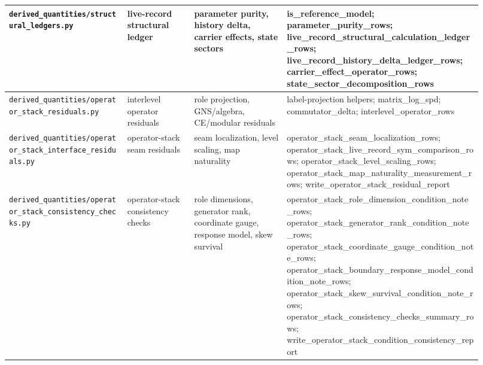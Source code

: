 \documentclass[11pt]{article}
\theoremstyle{remark}
\newcommand{\code}[1]{\texttt{#1}}
\numberwithin{equation}{section}
\begin{document}
\begin{longtable}{>{\raggedright\arraybackslash}p{0.23\linewidth}>{\raggedright\arraybackslash}p{0.13\linewidth}>{\raggedright\arraybackslash}p{0.18\linewidth}>{\raggedright\arraybackslash}p{0.38\linewidth}}
\hline
\code{derived\_\allowbreak{}quantities/structural\_\allowbreak{}ledgers.py} & live-record structural ledger & parameter purity, history delta, carrier effects, state sectors & is\_\allowbreak{}reference\_\allowbreak{}model; parameter\_\allowbreak{}purity\_\allowbreak{}rows; live\_\allowbreak{}record\_\allowbreak{}structural\_\allowbreak{}calculation\_\allowbreak{}ledger\_\allowbreak{}rows; live\_\allowbreak{}record\_\allowbreak{}history\_\allowbreak{}delta\_\allowbreak{}ledger\_\allowbreak{}rows; carrier\_\allowbreak{}effect\_\allowbreak{}operator\_\allowbreak{}rows; state\_\allowbreak{}sector\_\allowbreak{}decomposition\_\allowbreak{}rows\\
\hline
\code{derived\_\allowbreak{}quantities/operator\_\allowbreak{}stack\_\allowbreak{}residuals.py} & interlevel operator residuals & role projection, GNS/algebra, CE/modular residuals & label-projection helpers; matrix\_\allowbreak{}log\_\allowbreak{}spd; commutator\_\allowbreak{}delta; interlevel\_\allowbreak{}operator\_\allowbreak{}rows\\
\hline
\code{derived\_\allowbreak{}quantities/operator\_\allowbreak{}stack\_\allowbreak{}interface\_\allowbreak{}residuals.py} & operator-stack seam residuals & seam localization, level scaling, map naturality & operator\_\allowbreak{}stack\_\allowbreak{}seam\_\allowbreak{}localization\_\allowbreak{}rows; operator\_\allowbreak{}stack\_\allowbreak{}live\_\allowbreak{}record\_\allowbreak{}sym\_\allowbreak{}comparison\_\allowbreak{}rows; operator\_\allowbreak{}stack\_\allowbreak{}level\_\allowbreak{}scaling\_\allowbreak{}rows; operator\_\allowbreak{}stack\_\allowbreak{}map\_\allowbreak{}naturality\_\allowbreak{}measurement\_\allowbreak{}rows; write\_\allowbreak{}operator\_\allowbreak{}stack\_\allowbreak{}residual\_\allowbreak{}report\\
\hline
\code{derived\_\allowbreak{}quantities/operator\_\allowbreak{}stack\_\allowbreak{}consistency\_\allowbreak{}checks.py} & operator-stack consistency checks & role dimensions, generator rank, coordinate gauge, response model, skew survival & operator\_\allowbreak{}stack\_\allowbreak{}role\_\allowbreak{}dimension\_\allowbreak{}condition\_\allowbreak{}note\_\allowbreak{}rows; operator\_\allowbreak{}stack\_\allowbreak{}generator\_\allowbreak{}rank\_\allowbreak{}condition\_\allowbreak{}note\_\allowbreak{}rows; operator\_\allowbreak{}stack\_\allowbreak{}coordinate\_\allowbreak{}gauge\_\allowbreak{}condition\_\allowbreak{}note\_\allowbreak{}rows; operator\_\allowbreak{}stack\_\allowbreak{}boundary\_\allowbreak{}response\_\allowbreak{}model\_\allowbreak{}condition\_\allowbreak{}note\_\allowbreak{}rows; operator\_\allowbreak{}stack\_\allowbreak{}skew\_\allowbreak{}survival\_\allowbreak{}condition\_\allowbreak{}note\_\allowbreak{}rows; operator\_\allowbreak{}stack\_\allowbreak{}consistency\_\allowbreak{}checks\_\allowbreak{}summary\_\allowbreak{}rows; write\_\allowbreak{}operator\_\allowbreak{}stack\_\allowbreak{}condition\_\allowbreak{}consistency\_\allowbreak{}report\\

\end{longtable}
\end{document}
